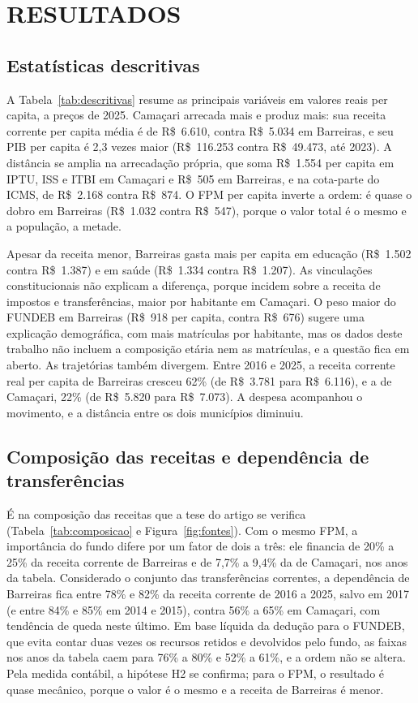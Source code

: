 \section{RESULTADOS}\label{sec:resultados}

\subsection{Estatísticas descritivas}

A Tabela~\ref{tab:descritivas} resume as principais variáveis em valores reais per capita, a preços de 2025. Camaçari arrecada mais e produz mais: sua receita corrente per capita média é de R\$~6.610, contra R\$~5.034 em Barreiras, e seu PIB per capita é 2,3 vezes maior (R\$~116.253 contra R\$~49.473, até 2023). A distância se amplia na arrecadação própria, que soma R\$~1.554 per capita em IPTU, ISS e ITBI em Camaçari e R\$~505 em Barreiras, e na cota-parte do ICMS, de R\$~2.168 contra R\$~874. O FPM per capita inverte a ordem: é quase o dobro em Barreiras (R\$~1.032 contra R\$~547), porque o valor total é o mesmo e a população, a metade.



Apesar da receita menor, Barreiras gasta mais per capita em educação (R\$~1.502 contra R\$~1.387) e em saúde (R\$~1.334 contra R\$~1.207). As vinculações constitucionais não explicam a diferença, porque incidem sobre a receita de impostos e transferências, maior por habitante em Camaçari. O peso maior do FUNDEB em Barreiras (R\$~918 per capita, contra R\$~676) sugere uma explicação demográfica, com mais matrículas por habitante, mas os dados deste trabalho não incluem a composição etária nem as matrículas, e a questão fica em aberto. As trajetórias também divergem. Entre 2016 e 2025, a receita corrente real per capita de Barreiras cresceu 62\% (de R\$~3.781 para R\$~6.116), e a de Camaçari, 22\% (de R\$~5.820 para R\$~7.073). A despesa acompanhou o movimento, e a distância entre os dois municípios diminuiu.

\subsection{Composição das receitas e dependência de transferências}

É na composição das receitas que a tese do artigo se verifica (Tabela~\ref{tab:composicao} e Figura~\ref{fig:fontes}). Com o mesmo FPM, a importância do fundo difere por um fator de dois a três: ele financia de 20\% a 25\% da receita corrente de Barreiras e de 7,7\% a 9,4\% da de Camaçari, nos anos da tabela. Considerado o conjunto das transferências correntes, a dependência de Barreiras fica entre 78\% e 82\% da receita corrente de 2016 a 2025, salvo em 2017 (e entre 84\% e 85\% em 2014 e 2015), contra 56\% a 65\% em Camaçari, com tendência de queda neste último. Em base líquida da dedução para o FUNDEB, que evita contar duas vezes os recursos retidos e devolvidos pelo fundo, as faixas nos anos da tabela caem para 76\% a 80\% e 52\% a 61\%, e a ordem não se altera. Pela medida contábil, a hipótese H2 se confirma; para o FPM, o resultado é quase mecânico, porque o valor é o mesmo e a receita de Barreiras é menor.

